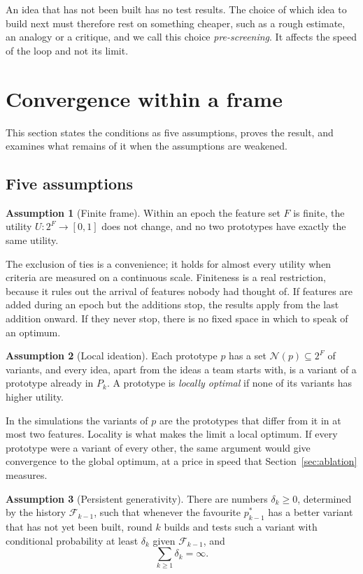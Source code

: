 \documentclass[10pt,twocolumn]{article}
\newcommand{\filt}{\mathcal{F}}
\newcommand{\Nb}{\mathcal{N}}
\newcommand{\Pk}{P_k}
\theoremstyle{definition}
\newtheorem{assumption}{Assumption}
\begin{document}
An idea that has not been built has no test results. The choice of which idea to build next must therefore rest on something cheaper, such as a rough estimate, an analogy or a critique, and we call this choice \emph{pre-screening}. It affects the speed of the loop and not its limit.

\section{Convergence within a frame}
\label{sec:theory}

This section states the conditions as five assumptions, proves the result, and examines what remains of it when the assumptions are weakened.

\subsection{Five assumptions}

\begin{assumption}[Finite frame]
\label{as:finite}
Within an epoch the feature set $F$ is finite, the utility $U:2^F\to[0,1]$ does not change, and no two prototypes have exactly the same utility.
\end{assumption}

The exclusion of ties is a convenience; it holds for almost every utility when criteria are measured on a continuous scale. Finiteness is a real restriction, because it rules out the arrival of features nobody had thought of. If features are added during an epoch but the additions stop, the results apply from the last addition onward. If they never stop, there is no fixed space in which to speak of an optimum.

\begin{assumption}[Local ideation]
\label{as:local}
Each prototype $p$ has a set $\Nb(p)\subseteq 2^F$ of variants, and every idea, apart from the ideas a team starts with, is a variant of a prototype already in $\Pk$. A prototype is \emph{locally optimal} if none of its variants has higher utility.
\end{assumption}

In the simulations the variants of $p$ are the prototypes that differ from it in at most two features. Locality is what makes the limit a local optimum. If every prototype were a variant of every other, the same argument would give convergence to the global optimum, at a price in speed that Section~\ref{sec:ablation} measures.

\begin{assumption}[Persistent generativity]
\label{as:gen}
There are numbers $\delta_k\ge0$, determined by the history $\filt_{k-1}$, such that whenever the favourite $p^*_{k-1}$ has a better variant that has not yet been built, round $k$ builds and tests such a variant with conditional probability at least $\delta_k$ given $\filt_{k-1}$, and
\begin{equation}
\label{eq:nonsummable}
\sum_{k\ge1}\delta_k=\infty .
\end{equation}
\end{assumption}
\end{document}
